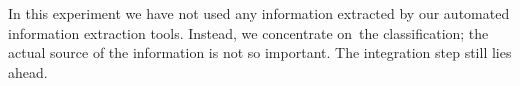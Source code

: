 In this experiment we have not used any information extracted by our automated information extraction tools. Instead, we concentrate on~the classification; the actual source of the information is not so important. The integration step still lies ahead.





